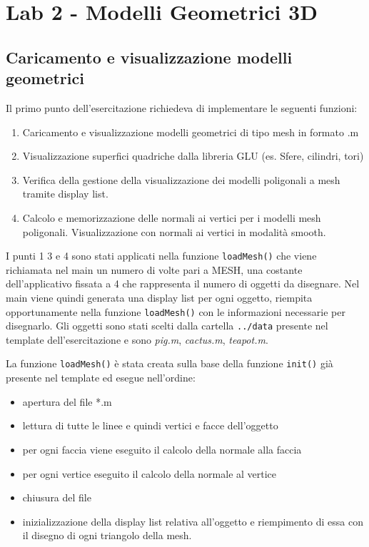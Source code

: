 \chapter*{Lab 2 - Modelli Geometrici 3D}

\section{Caricamento e visualizzazione modelli geometrici}
Il primo punto dell'esercitazione richiedeva di implementare le seguenti funzioni:
\begin{enumerate}
  \item Caricamento e visualizzazione modelli geometrici di tipo mesh in formato .m
  \item Visualizzazione superfici quadriche dalla libreria GLU (es. Sfere, cilindri, tori)
  \item Verifica della gestione della visualizzazione dei modelli poligonali a mesh tramite display list.
  \item Calcolo e memorizzazione delle normali ai vertici per i modelli mesh poligonali. Visualizzazione con normali ai vertici in modalità smooth.
\end{enumerate}

I punti 1 3 e 4 sono stati applicati nella funzione \texttt{loadMesh()} che viene richiamata nel main un numero di volte pari a MESH, una costante dell'applicativo fissata a 4 che rappresenta il numero di oggetti da disegnare. Nel main viene quindi generata una display list per ogni oggetto, riempita opportunamente nella funzione \texttt{loadMesh()} con le informazioni necessarie per disegnarlo. Gli oggetti sono stati scelti dalla cartella \texttt{../data} presente nel template dell'esercitazione e sono \textit{pig.m}, \textit{cactus.m}, \textit{teapot.m}.

La funzione \texttt{loadMesh()} è stata creata sulla base della funzione \texttt{init()} già presente nel template ed esegue nell'ordine:
\begin{itemize}
  \item apertura del file *.m
  \item lettura di tutte le linee e quindi vertici e facce dell'oggetto
  \item per ogni faccia viene eseguito il calcolo della normale alla faccia
  \item per ogni vertice eseguito il calcolo della normale al vertice
  \item chiusura del file
  \item inizializzazione della display list relativa all'oggetto e riempimento di essa con il disegno di ogni triangolo della mesh.
\end{itemize}
\newpage
